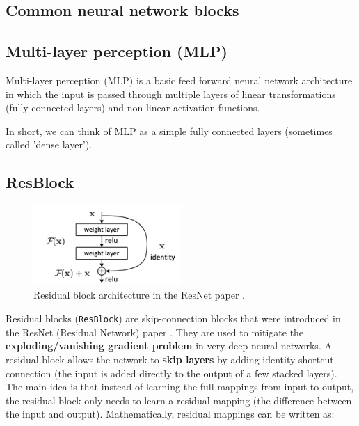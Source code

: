 \subsection{Common neural network blocks}
\label{appendix:blocks}



\subsection*{Multi-layer perception (MLP)}

Multi-layer perception (MLP) is a basic feed forward neural network architecture in which the input is passed through multiple layers of linear transformations (fully connected layers) and non-linear activation functions.

In short, we can think of MLP as a simple fully connected layers (sometimes called 'dense layer').








\subsection*{ResBlock}

\begin{figure}
    \centering
    \includegraphics[width=0.5\textwidth]{images/appendix/blocks/resnet.png}
    \caption{Residual block architecture in the ResNet paper \cite{resnet}.}
    \label{fig:appendix_blocks_residual_block}
\end{figure}

Residual blocks (\texttt{ResBlock}) are skip-connection blocks that were introduced in the ResNet (Residual Network) paper \cite{resnet}. They are used to mitigate the \textbf{exploding/vanishing gradient problem} in very deep neural networks. A residual block allows the network to \textbf{skip layers} by adding identity shortcut connection (the input is added directly to the output of a few stacked layers). The main idea is that instead of learning the full mappings from input to output, the residual block only needs to learn a residual mapping (the difference between the input and output). Mathematically, residual mappings can be written as:


